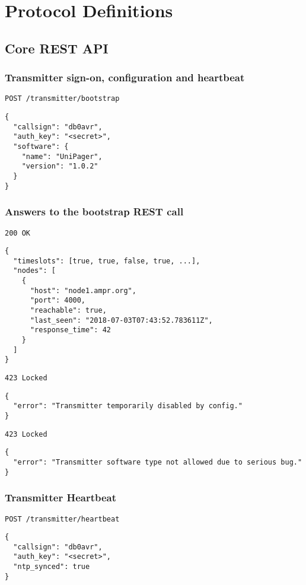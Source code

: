 \chapter{Protocol Definitions}

\section{Core REST API}

\subsection{Transmitter sign-on, configuration and heartbeat}
\label{protocoldef:TXsignon}

\texttt{POST /transmitter/bootstrap}
\begin{lstlisting}
{
  "callsign": "db0avr",
  "auth_key": "<secret>",
  "software": {
    "name": "UniPager",
    "version": "1.0.2"
  }
}
\end{lstlisting}

\subsection{Answers to the bootstrap REST call}
\label{protocoldef:TXconfig_or_error}
\texttt{200 OK}
\begin{lstlisting}
{
  "timeslots": [true, true, false, true, ...],
  "nodes": [
    {
      "host": "node1.ampr.org",
      "port": 4000,
      "reachable": true,
      "last_seen": "2018-07-03T07:43:52.783611Z",
      "response_time": 42
    }
  ]
}
\end{lstlisting}

\texttt{423 Locked}
\begin{lstlisting}
{
  "error": "Transmitter temporarily disabled by config."
}
\end{lstlisting}

\texttt{423 Locked}
\begin{lstlisting}
{
  "error": "Transmitter software type not allowed due to serious bug."
}
\end{lstlisting}


\subsection{Transmitter Heartbeat}
\texttt{POST /transmitter/heartbeat}
\begin{lstlisting}
{
  "callsign": "db0avr",
  "auth_key": "<secret>",
  "ntp_synced": true
}
\end{lstlisting}

